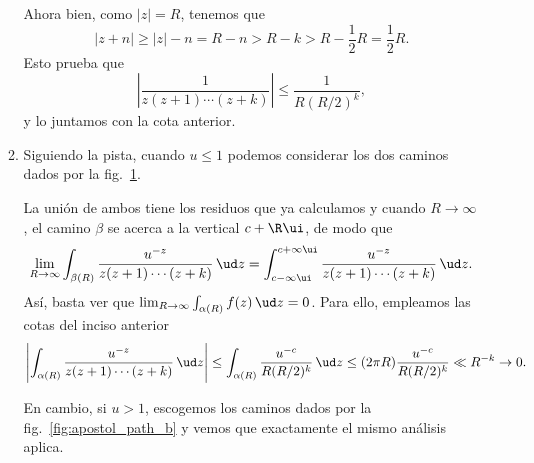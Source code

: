 \documentclass[11pt, reqno]{amsart}
\begin{document}
\begin{additional}
\begin{enumerate}
\begin{enumerate}
				Ahora bien, como $|z| = R$, tenemos que
				\[
					|z + n| \ge |z| - n = R - n > R - k > R - \frac{1}{2}R = \frac{1}{2}R.
				\]
				Esto prueba que
				\[
					\left\lvert\frac{1}{z(z + 1)\cdots(z + k)}\right\rvert \le \frac{1}{R(R/2)^k},
				\]
				y lo juntamos con la cota anterior.

			\item Siguiendo la pista, cuando $u \le 1$ podemos considerar los dos caminos dados por la fig.~\ref{fig:apostol_path}.

				\begin{figure}[!hbtp]
					\centering
					\caption{}
					\label{fig:apostol_path}
				\end{figure}

				La unión de ambos tiene los residuos que ya calculamos y cuando $R \to \infty$, el camino $\beta$ se acerca
				a la vertical $c + \R\ui$, de modo que
				\[
					\lim_{R \to \infty} \int_{\beta(R)} \frac{u^{-z}}{z(z+1)\cdots(z+k)} \, \ud z = \int_{c -
					\infty\ui}^{c + \infty\ui} \frac{u^{-z}}{z(z+1)\cdots(z+k)} \, \ud z.
				\]
				Así, basta ver que $\lim_{R \to \infty} \int_{\alpha(R)} f(z) \, \ud z = 0$.
				Para ello, empleamos las cotas del inciso anterior
				\[
					\left\lvert \int_{\alpha(R)} \frac{u^{-z}}{z(z+1)\cdots(z+k)} \, \ud z \right\rvert
					\le \int_{\alpha(R)} \frac{u^{-c}}{R(R/2)^k} \, \ud z
					\le (2 \pi R) \frac{u^{-c}}{R(R/2)^k} \ll R^{-k} \to 0.
				\]

				En cambio, si $u > 1$, escogemos los caminos dados por la fig.~\ref{fig:apostol_path_b} y vemos que
				exactamente el mismo análisis aplica.

				\begin{figure}[!hbtp]
					\centering
\end{figure}
\end{enumerate}
\end{enumerate}
\end{additional}
\end{document}
